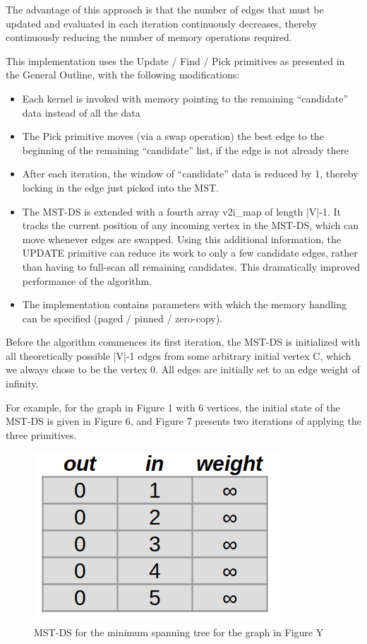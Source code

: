 \documentclass[sigconf,nonacm]{acmart}
\begin{document}
The advantage of this approach is that the number of edges that must be updated and evaluated in each iteration continuously decreases, thereby continuously reducing the number of memory operations required.

This implementation uses the Update / Find / Pick primitives as presented in the General Outline, with the following modifications:
\begin{itemize}
\item Each kernel is invoked with memory pointing to the remaining “candidate” data instead of all the data
\item The Pick primitive moves (via a swap operation) the best edge to the beginning of the remaining “candidate” list, if the edge is not already there
\item After each iteration, the window of “candidate” data is reduced by 1, thereby locking in the edge just picked into the MST.
\item The MST-DS is extended with a fourth array v2i\_map of length |V|-1.  It tracks the current position of any incoming vertex in the MST-DS, which can move whenever edges are swapped. Using this additional information, the UPDATE primitive can reduce its work to only a few candidate edges, rather than having to full-scan all remaining candidates. This dramatically improved performance of the algorithm.
\item The implementation contains parameters with which the memory handling can be specified (paged / pinned / zero-copy).
\end{itemize}


Before the algorithm commences its first iteration, the MST-DS is initialized with all theoretically possible |V|-1 edges from some arbitrary initial vertex C, which we always chose to be the vertex 0. All edges are initially set to an edge weight of infinity.

For example, for the graph in Figure 1 with 6 vertices, the initial state of the MST-DS is given in Figure 6, and Figure 7 presents two iterations of applying the three primitives.

\begin{figure}
\centering
\includegraphics[width=0.7\linewidth]{mst-datastructure-initial}
\caption{MST-DS for the minimum spanning tree for the graph in Figure Y}
\label{fig:mst-datastructure-initial}
\end{figure}
\end{document}
